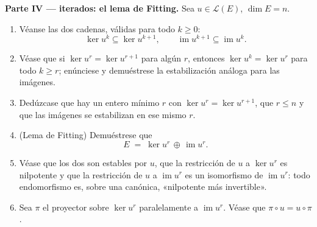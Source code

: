 \begin{problem}
\medskip
\noindent\textbf{Parte IV ---  iterados: el lema de Fitting.}
Sea $u \in \mathcal{L}(E)$, $\dim E = n$.
\begin{enumerate}[resume]
  \item Véanse las dos cadenas, válidas para todo $k \geq 0$:
        \[
        \ker u^k \subseteq \ker u^{k+1},
        \qquad
        \operatorname{im} u^{k+1} \subseteq \operatorname{im}
        u^k .
        \]
  \item Véase que si $\ker u^{r} = \ker u^{r+1}$ para algún $r$,
        entonces $\ker u^{k} = \ker u^{r}$ para todo $k \geq r$;
        enúnciese y demuéstrese la estabilización análoga para las
        imágenes.
  \item Dedúzcase que hay un entero mínimo $r$ con
        $\ker u^{r} = \ker u^{r+1}$, que $r \leq n$ y que las
        imágenes se estabilizan en ese mismo $r$.
  \item (Lema de Fitting) Demuéstrese que
        \[
        E \;=\; \ker u^{r} \,\oplus\, \operatorname{im} u^{r} .
        \]
  \item Véase que los dos  son estables por $u$, que la
        restricción de $u$ a $\ker u^{r}$ es nilpotente y que la
        restricción de $u$ a $\operatorname{im} u^{r}$ es un
        isomorfismo de $\operatorname{im} u^{r}$: todo endomorfismo
        es, sobre una  canónica, «nilpotente más
        invertible».
  \item Sea $\pi$ el proyector sobre $\ker u^{r}$ paralelamente a
        $\operatorname{im} u^{r}$. Véase que
        $\pi \circ u = u \circ \pi$.
\end{enumerate}


\end{problem}
